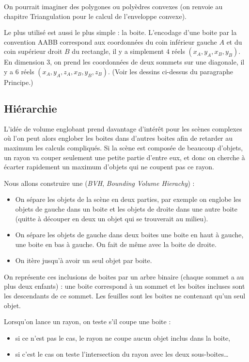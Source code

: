 \documentclass[11pt,class=report,crop=false]{standalone}
\begin{document}




On pourrait imaginer des polygones ou polyèdres convexes (on renvoie au chapitre \og{}Triangulation\fg{} pour le calcul de l'enveloppe convexe).

Le plus utilisé est aussi le plus simple : la boite.
L'encodage d'une boite par la convention \og{}AABB\fg{} correspond aux coordonnées du coin inférieur gauche $A$ et du coin supérieur droit $B$ du rectangle, il y a simplement $4$ réels $(x_A,y_A,x_B,y_B)$.
En dimension $3$, on prend les coordonnées de deux sommets sur une diagonale, il y a $6$ réels $(x_A,y_A,z_A,x_B,y_B,z_B)$. (Voir les dessins ci-dessus du paragraphe \og{}Principe\fg{}.)
 

\subsection{Hiérarchie}

L'idée de volume englobant prend davantage d'intérêt pour les scènes complexes où l'on peut alors englober les boites dans d'autres boites afin de retarder au maximum les calculs compliqués. Si la scène est composée de beaucoup d'objets, un rayon va couper seulement une petite partie d'entre eux, et donc on cherche à écarter rapidement un maximum d'objets qui ne coupent pas ce rayon.

Nous allons construire une  (\emph{BVH}, \emph{Bounding Volume Hierachy}) :
\begin{itemize}
	\item On sépare les objets de la scène en deux parties, par exemple on englobe les objets de gauche dans un boite et les objets de droite dans une autre boite (quitte à découper en deux un objet qui se trouverait au milieu).
	\item On sépare les objets de gauche dans deux boites une boite en haut à gauche, une boite en bas à gauche. On fait de même avec la boite de droite.
	\item On itère jusqu'à avoir un seul objet par boite.
\end{itemize}



On représente ces inclusions de boites par un arbre binaire (chaque sommet a au plus deux enfants) : une boite correspond à un sommet et les boites incluses sont les descendants de ce sommet. Les feuilles sont les boites ne contenant qu'un seul objet.

Lorsqu'on lance un rayon, on teste s'il coupe une boite :
\begin{itemize}
  \item si ce n'est pas le cas, le rayon ne coupe aucun objet inclus dans la boite,
  \item si c'est le cas on teste l'intersection du rayon avec les deux sous-boites\ldots
\end{itemize}


  
\end{document}

